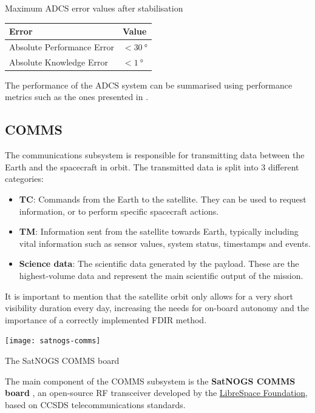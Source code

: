 \documentclass[a4paper,nobib]{tufte-book}
\begin{document}
\begin{margintable}
	\centering
	\caption[Maximum ADCS error values after stabilisation]{Maximum \ac{ADCS} error values after stabilisation}
	\label{tab:adcsape}
	\begin{tabular}{@{}ll@{}}
		\toprule
		Error                      & Value                    \\ \midrule
		Absolute Performance Error & \( < \SI{30}{\degree} \) \\
		Absolute Knowledge Error   & \( < \SI{1}{\degree} \) 
	\end{tabular}
\end{margintable}

The performance of the \ac{ADCS} system can be summarised using performance metrics such as the ones presented in .

\subsection{\acf{COMMS}}

The communications subsystem is responsible for transmitting data between the Earth and the spacecraft in orbit. The transmitted data is split into 3 different categories\autocite{DDJF_TTC}:
\begin{itemize}
	\item \textbf{\acf{TC}}: Commands from the Earth to the satellite. They can be used to request information, or to perform specific spacecraft actions.
	\item \textbf{\acf{TM}}: Information sent from the satellite towards Earth, typically including vital information such as sensor values, system status, timestamps and events.
	\item \textbf{Science data}: The scientific data generated by the payload. These are the highest-volume data and represent the main scientific output of the mission.
\end{itemize}

It is important to mention that the satellite orbit only allows for a very short visibility duration every day, increasing the needs for on-board autonomy and the importance of a correctly implemented \acs{FDIR} method.

\begin{marginfigure}
	\texttt{[image: satnogs-comms]}
	\caption{The SatNOGS COMMS board}
\end{marginfigure}

The main component of the \acs{COMMS} subsystem is the \textbf{SatNOGS COMMS board} \autocite{surligas_satnogscomms_2021}, an open-source \acs{RF} transceiver developed by the \href{https://libre.space/}{LibreSpace Foundation}, based on \acs{CCSDS} telecommunications standards.
\end{document}
